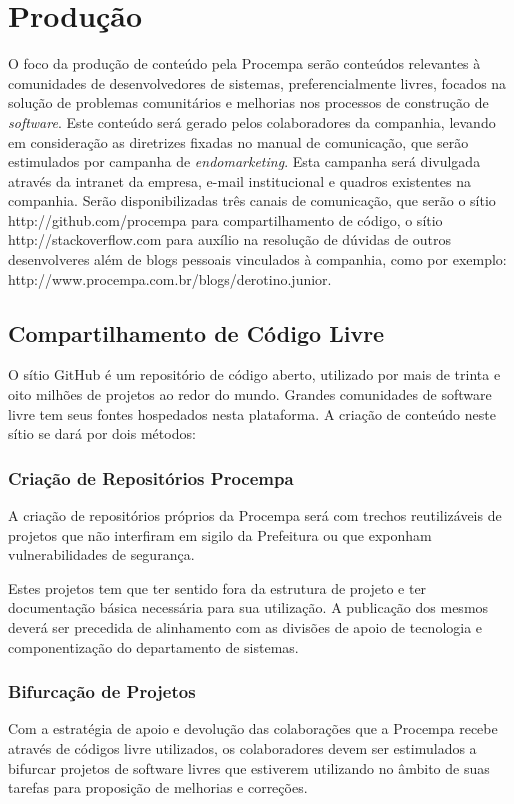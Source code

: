 \chapter{Produção}

O foco da produção de conteúdo pela Procempa serão conteúdos relevantes à comunidades de desenvolvedores de sistemas, preferencialmente livres, focados na solução de problemas comunitários e melhorias nos processos de construção de \emph{software}.
Este conteúdo será gerado pelos colaboradores da companhia, levando em consideração as diretrizes fixadas no manual de comunicação, que serão estimulados por campanha de \emph{endomarketing}. Esta campanha será divulgada através da intranet da empresa, e-mail institucional e quadros existentes na companhia.
Serão disponibilizadas três canais de comunicação, que serão o sítio http://github.com/procempa para compartilhamento de código, o sítio http://stackoverflow.com para auxílio na resolução de dúvidas de outros desenvolveres além de blogs pessoais vinculados à companhia, como por exemplo: http://www.procempa.com.br/blogs/derotino.junior.

\section{Compartilhamento de Código Livre}
O sítio GitHub é um repositório de código aberto, utilizado por mais de trinta e oito milhões de projetos ao redor do mundo. Grandes comunidades de software livre tem seus fontes hospedados nesta plataforma.
A criação de conteúdo neste sítio se dará por dois métodos:

\subsection{Criação de Repositórios Procempa}
A criação de repositórios próprios da Procempa será com trechos reutilizáveis de projetos que não interfiram em sigilo da Prefeitura ou que exponham vulnerabilidades de segurança.

Estes projetos tem que ter sentido fora da estrutura de projeto e ter documentação básica necessária para sua utilização. A publicação dos mesmos deverá ser precedida de alinhamento com as divisões de apoio de tecnologia e componentização do departamento de sistemas.

\subsection{Bifurcação de Projetos}
Com a estratégia de apoio e devolução das colaborações que a Procempa recebe através de códigos livre utilizados, os colaboradores devem ser estimulados a bifurcar projetos de software livres que estiverem utilizando no âmbito de suas tarefas para proposição de melhorias e correções.

